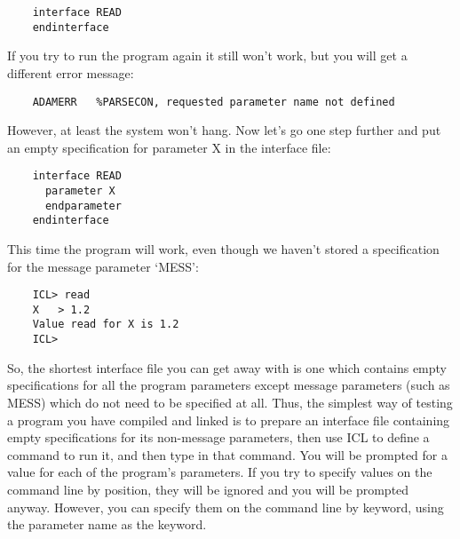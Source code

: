 \begin{small}
\begin{verbatim}
    interface READ
    endinterface
\end{verbatim}
\end{small}

If you try to run the program again it still won't work, but you will get
a different error message:

\begin{small}
\begin{verbatim}
    ADAMERR   %PARSECON, requested parameter name not defined
\end{verbatim}
\end{small}

However, at least the system won't hang.
Now let's go one step further and put an empty specification for parameter X in
the interface file:

\begin{small}
\begin{verbatim}
    interface READ
      parameter X
      endparameter
    endinterface
\end{verbatim}
\end{small}

This time the program will work, even though we haven't stored a specification
for the message parameter `MESS':

\begin{small}
\begin{verbatim}
    ICL> read
    X   > 1.2
    Value read for X is 1.2
    ICL>
\end{verbatim}
\end{small}

So, the shortest interface file you can get away with is one which contains
empty specifications for all the program parameters except message parameters
(such as MESS) which do not need to be specified at all.
Thus, the simplest way of testing a program you have compiled and linked is to
prepare an interface file containing empty specifications for its non-message
parameters, then use ICL to define a command to run it, and then type in that
command.
You will be prompted for a value for each of the program's parameters.
If you try to specify values on the command line by position, they will be
ignored and you will be prompted anyway.
However, you can specify them on the command line by keyword, using the
parameter name as the keyword.

